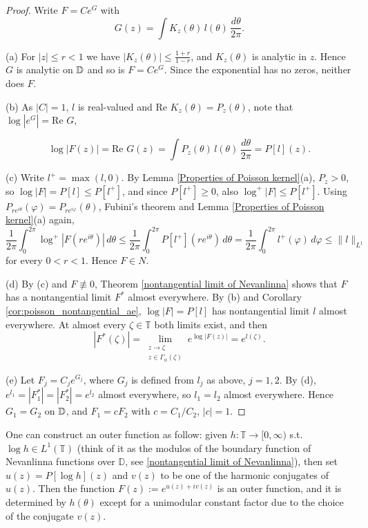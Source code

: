 \begin{proof}
Write $F=Ce^{G}$ with
\begin{equation*}
  G(z)=\int K_z(\theta)\,l(\theta)\,\frac{d\theta}{2\pi}.
\end{equation*}

(a) For $|z|\leq r<1$ we have $|K_z(\theta)|\leq\frac{1+r}{1-r}$, and $K_z(\theta)$ is analytic
in $z$. Hence $G$ is analytic on $\mathbb{D}$ and so is
$F=Ce^{G}$. Since the exponential has no zeros, neither does $F$.

(b) As $|C|=1$, $l$ is real-valued and $\text{Re } K_z(\theta)=P_z(\theta)$, note
that $\log |e^G|=\text{Re } G$,

\begin{equation*}
  \log|F(z)|=\text{Re } G(z)=\int P_z(\theta)\,l(\theta)\,\frac{d\theta}{2\pi}=P[l](z).
\end{equation*}

(c) Write $l^+=\max(l,0)$. By Lemma \ref{Properties of Poisson kernel}(a), $P_z>0$, so
$\log|F|=P[l]\leq P[l^+]$, and since $P[l^+]\geq 0$, also $\log^+|F|\leq P[l^+]$. Using
$P_{re^{i\theta}}(\varphi)=P_{re^{i\varphi}}(\theta)$, Fubini's theorem and Lemma
\ref{Properties of Poisson kernel}(a) again,
\begin{equation*}
  \frac{1}{2\pi}\int_0^{2\pi}\log^+|F(re^{i\theta})|\,d\theta
  \leq\frac{1}{2\pi}\int_0^{2\pi}P[l^+](re^{i\theta})\,d\theta
  =\frac{1}{2\pi}\int_0^{2\pi}l^+(\varphi)\,d\varphi
  \leq\|l\|_{L^1}
\end{equation*}
for every $0<r<1$. Hence $F\in N$.

(d) By (c) and $F\not\equiv0$, Theorem \ref{nontangential limit of Nevanlinna} shows that $F$ has
a nontangential limit $F^*$ almost everywhere. By (b) and Corollary
\ref{cor:poisson_nontangential_ae}, $\log|F|=P[l]$ has nontangential limit $l$ almost
everywhere. At almost every $\zeta\in\mathbb{T}$ both limits exist, and then
\begin{equation*}
  |F^*(\zeta)|=\lim_{\substack{z\to\zeta\\ z\in\Gamma_\alpha(\zeta)}}e^{\log|F(z)|}=e^{l(\zeta)}.
\end{equation*}

(e) Let $F_j=C_je^{G_j}$, where $G_j$ is defined from $l_j$ as above, $j=1,2$. By (d),
$e^{l_1}=|F_1^*|=|F_2^*|=e^{l_2}$ almost everywhere, so $l_1=l_2$ almost everywhere. Hence
$G_1=G_2$ on $\mathbb{D}$, and $F_1=cF_2$ with $c=C_1/C_2$, $|c|=1$.
\end{proof}

\begin{remark}
One can construct an outer function as follow: given $h:\mathbb{T}\rightarrow [0,\infty)$
s.t. $\log h\in L^1(\mathbb{T})$
(think of it as the modulos of the boundary function of Nevanlinna functions over $\mathbb{D}$, 
see \ref{nontangential limit of Nevanlinna}), then set $u(z)=P[\log h](z)$ and $v(z)$ to be one of the
harmonic conjugates of $u(z)$. Then the function $F(z):= e^{u(z)+i v(z)}$ is an outer function,
and it is determined by $h(\theta)$ except for a unimodular constant factor due to the choice
of the conjugate $v(z)$. 
\end{remark}

